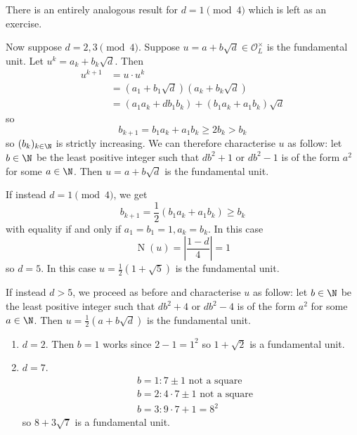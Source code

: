 \documentclass[a4paper]{article}
\renewcommand*{\O}{\mathcal{O}}
\DeclareMathOperator{\n}{N}
\begin{document}
There is an entirely analogous result for \(d = 1 \pmod 4\) which is left as an exercise.

Now suppose \(d = 2, 3 \pmod 4\). Suppose \(u = a + b \sqrt d \in \O_L^\times\) is the fundamental unit. Let \(u^k = a_k + b_k \sqrt d\). Then
\begin{align*}
  u^{k + 1}
  &= u \cdot u^k \\
  &= (a_1 + b_1 \sqrt d)(a_k + b_k \sqrt d) \\
  &= (a_1a_k + d b_1b_k) + (b_1a_k + a_1b_k) \sqrt d
\end{align*}
so
\[
  b_{k + 1} = b_1a_k + a_1b_k \geq 2b_k > b_k
\]
so \((b_k)_{k \in \N}\) is strictly increasing. We can therefore characterise \(u\) as follow: let \(b \in \N\) be the least positive integer such that \(db^2 + 1\) or \(db^2 - 1\) is of the form \(a^2\) for some \(a \in \N\). Then \(u = a + b \sqrt d\) is the fundamental unit.

If instead \(d = 1 \pmod 4\), we get
\[
  b_{k + 1} = \frac{1}{2}(b_1a_k + a_1b_k) \geq b_k
\]
with equality if and only if \(a_1 = b_1 = 1, a_k = b_k\). In this case
\[
  \n(u) = \left| \frac{1 - d}{4} \right| = 1
\]
so \(d = 5\). In this case \(u = \frac{1}{2} (1 + \sqrt 5)\) is the fundamental unit.

If instead \(d > 5\), we proceed as before and characterise \(u\) as follow: let \(b \in \N\) be the least positive integer such that \(db^2 + 4\) or \(db^2 - 4\) is of the form \(a^2\) for some \(a \in \N\). Then \(u = \frac{1}{2} (a + b \sqrt d)\) is the fundamental unit.

\begin{eg}\leavevmode
  \begin{enumerate}
  \item \(d = 2\). Then \(b = 1\) works since \(2 - 1 = 1^2\) so \(1 + \sqrt 2\) is a fundamental unit.
  \item \(d = 7\).
    \begin{align*}
      & b = 1: 7 \pm 1 \text{ not a square} \\
      & b = 2: 4 \cdot 7 \pm 1 \text{ not a square} \\
      & b = 3: 9 \cdot 7 + 1 = 8^2
    \end{align*}
    so \(8 + 3 \sqrt 7\) is a fundamental unit.
  \end{enumerate}
\end{eg}
\end{document}
